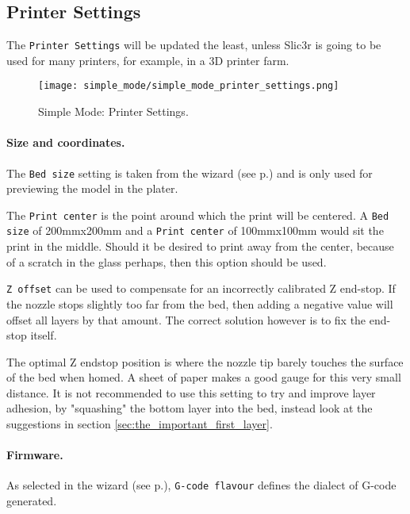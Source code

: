 \subsection{Printer Settings}

The \texttt{Printer Settings} will be updated the least, unless Slic3r is going to be used for many printers, for example, in a 3D printer farm.

\begin{figure}[H]
\centering
\texttt{[image: simple\_mode/simple\_mode\_printer\_settings.png]}
\caption{Simple Mode: Printer Settings.}
\label{fig:simple_mode_printer_settings}
\end{figure}

\paragraph{Size and coordinates.} %
\label{par:size_and_coordinates}
The \texttt{Bed size} setting is taken from the wizard (see p.\pageref{sub:2_bed_size}) and is only used for previewing the model in the plater.

The \texttt{Print center} is the point around which the print will be centered.  A \texttt{Bed size} of 200mmx200mm and a \texttt{Print center} of 100mmx100mm would sit the print in the middle.  Should it be desired to print away from the center, because of a scratch in the glass perhaps, then this option should be used.

\texttt{Z offset} can be used to compensate for an incorrectly calibrated Z end-stop.  If the nozzle stops slightly too far from the bed, then adding a negative value will offset all layers by that amount.  The correct solution however is to fix the end-stop itself.

The optimal Z endstop position is where the nozzle tip barely touches the surface of the bed when homed.  A sheet of paper makes a good gauge for this very small distance.  It is not recommended to use this setting to try and improve layer adhesion, by "squashing" the bottom layer into the bed, instead look at the suggestions in section \ref{sec:the_important_first_layer}.

\paragraph{Firmware.} %
\label{par:firmware}
As selected in the wizard (see p.\pageref{sub:1_firmware_type}), \texttt{G-code flavour} defines the dialect of G-code generated.


